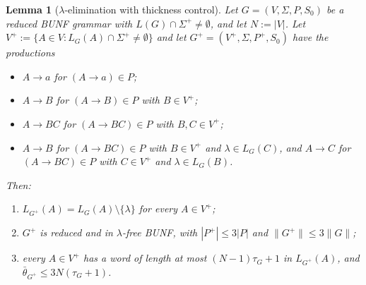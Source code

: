 \documentclass[11pt]{article}
\numberwithin{equation}{section}
\theoremstyle{plain}
\newtheorem{lemma}[theorem]{Lemma}
\theoremstyle{definition}
\theoremstyle{remark}
\theoremstyle{plain}
\begin{document}
\begin{lemma}[$\lambda$-elimination with thickness control]
\label{lem:lambda-elimination}
Let $G=(V,\Sigma,P,S_0)$ be a reduced BUNF grammar with
$L(G)\cap\Sigma^+\ne\emptyset$, and let $N:=|V|$.  Let
$V^+:=\{A\in V:L_G(A)\cap\Sigma^+\ne\emptyset\}$ and let $G^+=(V^+,\Sigma,P^+,S_0)$
have the productions
\begin{itemize}[leftmargin=*,nosep]
\item $A\to a$ for $(A\to a)\in P$;
\item $A\to B$ for $(A\to B)\in P$ with $B\in V^+$;
\item $A\to BC$ for $(A\to BC)\in P$ with $B,C\in V^+$;
\item $A\to B$ for $(A\to BC)\in P$ with $B\in V^+$ and $\lambda\in L_G(C)$, and
$A\to C$ for $(A\to BC)\in P$ with $C\in V^+$ and $\lambda\in L_G(B)$.
\end{itemize}
Then:
\begin{enumerate}[label=\textup{(\roman*)},leftmargin=*]
\item $L_{G^+}(A)=L_G(A)\setminus\{\lambda\}$ for every $A\in V^+$;
\item $G^+$ is reduced and in $\lambda$-free BUNF, with $|P^+|\le3|P|$ and
$\|G^+\|\le3\|G\|$;
\item every $A\in V^+$ has a word of length at most $(N-1)\tau_G+1$ in
$L_{G^+}(A)$, and $\bar\theta_{G^+}\le3N(\tau_G+1)$.
\end{enumerate}
\end{lemma}
\end{document}
